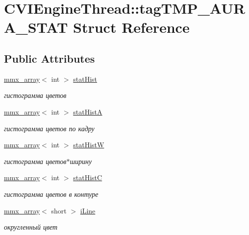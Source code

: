 \hypertarget{struct_c_v_i_engine_thread_1_1tag_t_m_p___a_u_r_a___s_t_a_t}{\section{C\+V\+I\+Engine\+Thread\+:\+:tag\+T\+M\+P\+\_\+\+A\+U\+R\+A\+\_\+\+S\+T\+A\+T Struct Reference}
\label{struct_c_v_i_engine_thread_1_1tag_t_m_p___a_u_r_a___s_t_a_t}
}
\subsection*{Public Attributes}
\begin{DoxyCompactItemize}
\item 
\hyperlink{classmmx__array}{mmx\+\_\+array}$<$ int $>$ \hyperlink{struct_c_v_i_engine_thread_1_1tag_t_m_p___a_u_r_a___s_t_a_t_a1259267e7d38e77653ece8e1c5bb63a9}{stat\+Hist}
\begin{DoxyCompactList}\small\item\em гистограмма цветов \end{DoxyCompactList}\item 
\hyperlink{classmmx__array}{mmx\+\_\+array}$<$ int $>$ \hyperlink{struct_c_v_i_engine_thread_1_1tag_t_m_p___a_u_r_a___s_t_a_t_aa9dff3136c04a571f82c5d15deeca370}{stat\+Hist\+A}
\begin{DoxyCompactList}\small\item\em гистограмма цветов по кадру \end{DoxyCompactList}\item 
\hyperlink{classmmx__array}{mmx\+\_\+array}$<$ int $>$ \hyperlink{struct_c_v_i_engine_thread_1_1tag_t_m_p___a_u_r_a___s_t_a_t_a0bb0bffd8702d64bca468c48409afc4d}{stat\+Hist\+W}
\begin{DoxyCompactList}\small\item\em гистограмма цветов$\ast$ширину \end{DoxyCompactList}\item 
\hyperlink{classmmx__array}{mmx\+\_\+array}$<$ int $>$ \hyperlink{struct_c_v_i_engine_thread_1_1tag_t_m_p___a_u_r_a___s_t_a_t_aba2ac6a4a2f4096c664860c7e600b890}{stat\+Hist\+C}
\begin{DoxyCompactList}\small\item\em гистограмма цветов в контуре \end{DoxyCompactList}\item 
\hyperlink{classmmx__array}{mmx\+\_\+array}$<$ short $>$ \hyperlink{struct_c_v_i_engine_thread_1_1tag_t_m_p___a_u_r_a___s_t_a_t_afbc1d96e6f8f6ffcdd008147e7702e2f}{i\+Line}
\begin{DoxyCompactList}\small\item\em округленный цвет \end{DoxyCompactList}\end{DoxyCompactItemize}


